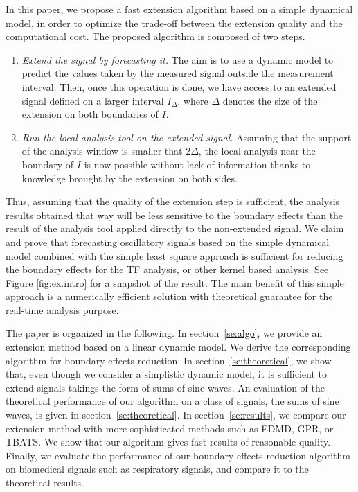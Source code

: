\documentclass[journal]{IEEEtran}
\begin{document}
In this paper, we propose a fast extension algorithm based on a simple dynamical model, in order to optimize the trade-off between the extension quality and the computational cost. The proposed algorithm is composed of two steps.
\begin{enumerate}
\item \emph{Extend the signal by forecasting it.} The aim is to use a dynamic model to predict the values taken by the measured signal outside the measurement interval. Then, once this operation is done, we have access to an extended signal defined on a larger interval $I_\Delta$, where $\Delta$ denotes the size of the extension on both boundaries of $I$.
\item \emph{Run the local analysis tool on the extended signal.} Assuming that the support of the analysis window is smaller that $2\Delta$, the local analysis near the boundary of $I$ is now possible without lack of information thanks to knowledge brought by the extension on both sides. 
\end{enumerate}
Thus, assuming that the quality of the extension step is sufficient, the analysis results obtained that way will be less sensitive to the boundary effects than the result of the analysis tool applied directly to the non-extended signal. 
%
We claim and prove that forecasting oscillatory signals based on the simple dynamical model combined with the simple least square approach is sufficient for reducing the boundary effects for the TF analysis, or other kernel based analysis. See Figure \ref{fig:ex.intro} for a snapshot of the result. The main benefit of this simple approach is a numerically efficient solution with theoretical guarantee for the real-time analysis purpose. 

The paper is organized in the following. In section~\ref{se:algo}, we provide an extension method based on a linear dynamic model. We derive the corresponding algorithm for boundary effects reduction. In section~\ref{se:theoretical}, we show that, even though we consider a simplistic dynamic model, it is sufficient to extend signals takings the form of sums of sine waves. An evaluation of the theoretical performance of our algorithm on a class of signals, the sums of sine waves, is given in section~\ref{se:theoretical}. In section~\ref{se:results}, we compare our extension method with more sophisticated methods such as EDMD, GPR, or TBATS. We show that our algorithm gives fast results of reasonable quality. Finally, we evaluate the performance of our boundary effects reduction algorithm on biomedical signals such as respiratory signals, and compare it to the theoretical results. 
\end{document}
